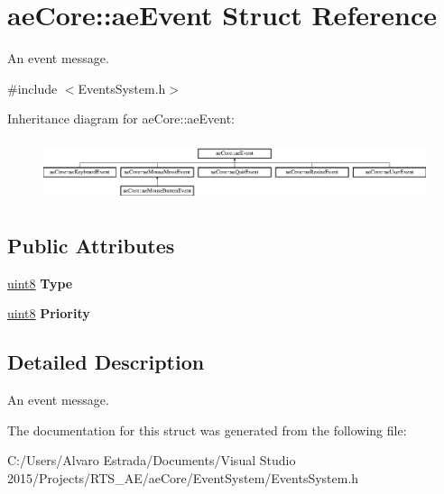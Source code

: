 \hypertarget{structae_core_1_1ae_event}{}\section{ae\+Core\+:\+:ae\+Event Struct Reference}
\label{structae_core_1_1ae_event}


An event message.  




{\ttfamily \#include $<$Events\+System.\+h$>$}

Inheritance diagram for ae\+Core\+:\+:ae\+Event\+:\begin{figure}[H]
\begin{center}
\leavevmode
\includegraphics[height=1.796791cm]{structae_core_1_1ae_event}
\end{center}
\end{figure}
\subsection*{Public Attributes}
\begin{DoxyCompactItemize}
\item 
\hyperlink{namespaceae_core_aa13093dc911869e5b24942552898f01f}{uint8} {\bfseries Type}\hypertarget{structae_core_1_1ae_event_ad3204f8b2c4098c90b8f773b85368e80}{}\label{structae_core_1_1ae_event_ad3204f8b2c4098c90b8f773b85368e80}

\item 
\hyperlink{namespaceae_core_aa13093dc911869e5b24942552898f01f}{uint8} {\bfseries Priority}\hypertarget{structae_core_1_1ae_event_ac8be00cb6fbc2e43485b4e95e177f670}{}\label{structae_core_1_1ae_event_ac8be00cb6fbc2e43485b4e95e177f670}

\end{DoxyCompactItemize}


\subsection{Detailed Description}
An event message. 

The documentation for this struct was generated from the following file\+:\begin{DoxyCompactItemize}
\item 
C\+:/\+Users/\+Alvaro Estrada/\+Documents/\+Visual Studio 2015/\+Projects/\+R\+T\+S\+\_\+\+A\+E/ae\+Core/\+Event\+System/Events\+System.\+h\end{DoxyCompactItemize}
